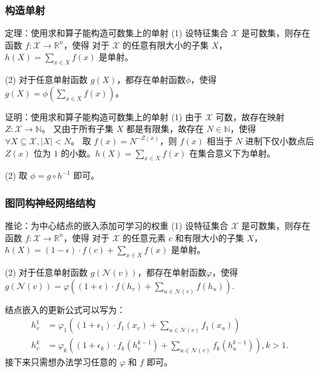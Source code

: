 \documentclass{beamer}
\begin{document}
\begin{frame}

  \frametitle{构造单射}
  \begin{block}{定理：使用求和算子能构造可数集上的单射}
    (1) 设特征集合 $\mathcal{X}$ 是可数集，则存在函数 $f: \mathcal{X} \rightarrow \mathbb{R}^n$，使得
    对于 $\mathcal{X}$ 的任意有限大小的子集 $X$，$h(X) = \sum_{x \in X} f(x)$ 是单射。

    (2) 对于任意单射函数 $g(X)$，都存在单射函数$\phi$，使得 $g(X) = \phi(\sum_{x \in X} f(x))$。
  \end{block}

  \begin{block}{证明：使用求和算子能构造可数集上的单射}
    (1) 由于 $\mathcal{X}$ 可数，故存在映射 $Z : \mathcal{X} \rightarrow \mathbb{N}$。
    又由于所有子集 $X$ 都是有限集，故存在 $N \in \mathbb{N}$，使得 $\forall X \subseteq \mathcal{X}, |X| < N$。
    取 $f(x) = N^{-Z(x)}$，则 $f(x)$ 相当于 $N$ 进制下仅小数点后 $Z(x)$ 位为 $1$ 的小数。$h(X) = \sum_{x \in X} f(x)$
    在集合意义下为单射。
    
    (2) 取 $\phi = g \circ h^{-1}$ 即可。
  \end{block}

\end{frame}

\begin{frame}

  \frametitle{图同构神经网络结构}
  \begin{block}{推论：为中心结点的嵌入添加可学习的权重}
    (1) 设特征集合 $\mathcal{X}$ 是可数集，则存在函数 $f: \mathcal{X} \rightarrow \mathbb{R}^n$，使得
    对于 $\mathcal{X}$ 的任意元素 $c$ 和有限大小的子集 $X$，$h(X) = (1 - \epsilon) \cdot f(c) + \sum_{x \in X} f(x)$ 是单射。
    
    (2) 对于任意单射函数 $g(\mathcal{N}(v))$，都存在单射函数$\varphi$，使得 $g(\mathcal{N}(v)) = \varphi((1 + \epsilon) \cdot f(h_v) + \sum_{u \in \mathcal{N}(v)} f(h_u))$.
  \end{block}
  结点嵌入的更新公式可以写为：
  \begin{align*}
    h_v^1 &= \varphi_1((1 + \epsilon_1) \cdot f_1(x_v) + \sum_{u \in \mathcal{N}(v)} f_1(x_u)) \\
    h_v^k &= \varphi_k((1 + \epsilon_k) \cdot f_k(h^{k-1}_v) + \sum_{u \in \mathcal{N}(v)} f_k(h^{k-1}_u)), k > 1.
  \end{align*}
  接下来只需想办法学习任意的 $\varphi$ 和 $f$ 即可。

\end{frame}
\end{document}
